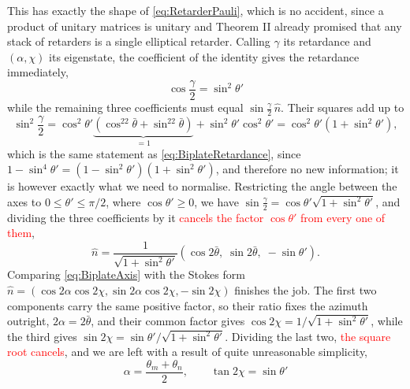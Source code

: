            This has exactly the shape of \ref{eq:RetarderPauli}, which is no accident, since a product of unitary matrices is unitary and Theorem II already promised that any stack of retarders is a single elliptical retarder. Calling $\gamma$ its retardance and $\left(\alpha,\chi\right)$ its eigenstate, the coefficient of the identity gives the retardance immediately,
            \begin{equation}\label{eq:BiplateRetardance}
                \boxed{\;\cos\frac{\gamma}{2} = \sin^2\theta'\;}
            \end{equation}
            while the remaining three coefficients must equal $\sin\frac{\gamma}{2}\,\hat{n}$. Their squares add up to
            \begin{equation*}
                \sin^2\frac{\gamma}{2} = \cos^2\theta'\underbrace{\left(\cos^22\bar\theta+\sin^22\bar\theta\right)}_{=1}+\sin^2\theta'\cos^2\theta' = \cos^2\theta'\left(1+\sin^2\theta'\right),
            \end{equation*}
            which is the same statement as \ref{eq:BiplateRetardance}, since $1-\sin^4\theta'=\left(1-\sin^2\theta'\right)\left(1+\sin^2\theta'\right)$, and therefore no new information; it is however exactly what we need to normalise. Restricting the angle between the axes to $0\leq\theta'\leq\pi/2$, where $\cos\theta'\geq0$, we have $\sin\frac{\gamma}{2}=\cos\theta'\sqrt{1+\sin^2\theta'}$, and dividing the three coefficients by it \textcolor{red}{cancels the factor $\cos\theta'$ from every one of them},
            \begin{equation}\label{eq:BiplateAxis}
                \hat{n} = \frac{1}{\sqrt{1+\sin^2\theta'}}\left(\cos2\bar{\theta},\;\sin2\bar{\theta},\;-\sin\theta'\right).
            \end{equation}
            Comparing \ref{eq:BiplateAxis} with the Stokes form $\hat n=\left(\cos2\alpha\cos2\chi,\sin2\alpha\cos2\chi,-\sin2\chi\right)$ finishes the job. The first two components carry the same positive factor, so their ratio fixes the azimuth outright, $2\alpha=2\bar\theta$, and their common factor gives $\cos2\chi=1/\sqrt{1+\sin^2\theta'}$, while the third gives $\sin2\chi=\sin\theta'/\sqrt{1+\sin^2\theta'}$. Dividing the last two, \textcolor{red}{the square root cancels}, and we are left with a result of quite unreasonable simplicity,
            \begin{equation}\label{eq:BiplateEigenstate}
                \boxed{\;\alpha = \frac{\theta_m+\theta_n}{2}, \qquad \tan2\chi = \sin\theta' \;}
            \end{equation}


